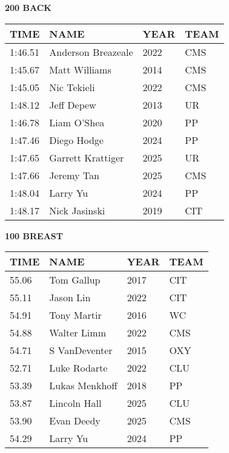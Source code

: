 \begin{minipage}[t]{0.48\textwidth}
\centering
\textbf{200 BACK}\\[0.05cm]
\begin{tabular}{@{}p{1.8cm}p{2.8cm}p{1.2cm}p{1.4cm}@{}}
\hline
\textbf{TIME} & \textbf{NAME} & \textbf{YEAR} & \textbf{TEAM} \\
\hline
1:46.51 & Anderson Breazeale & 2022 & CMS \\
1:45.67 & Matt Williams & 2014 & CMS \\
1:45.05 & Nic Tekieli & 2022 & CMS \\
1:48.12 & Jeff Depew & 2013 & UR \\
1:46.78 & Liam O'Shea & 2020 & PP \\
1:47.46 & Diego Hodge & 2024 & PP \\
1:47.65 & Garrett Krattiger & 2025 & UR \\
1:47.66 & Jeremy Tan & 2025 & CMS \\
1:48.04 & Larry Yu & 2024 & PP \\
1:48.17 & Nick Jasinski & 2019 & CIT \\
\hline
\end{tabular}
\end{minipage}\hfill
\begin{minipage}[t]{0.48\textwidth}
\centering
\textbf{100 BREAST}\\[0.05cm]
\begin{tabular}{@{}p{1.8cm}p{2.8cm}p{1.2cm}p{1.4cm}@{}}
\hline
\textbf{TIME} & \textbf{NAME} & \textbf{YEAR} & \textbf{TEAM} \\
\hline
55.06 & Tom Gallup & 2017 & CIT \\
55.11 & Jason Lin & 2022 & CIT \\
54.91 & Tony Martir & 2016 & WC \\
54.88 & Walter Limm & 2022 & CMS \\
54.71 & S VanDeventer & 2015 & OXY \\
52.71 & Luke Rodarte & 2022 & CLU \\
53.39 & Lukas Menkhoff & 2018 & PP \\
53.87 & Lincoln Hall & 2025 & CLU \\
53.90 & Evan Deedy & 2025 & CMS \\
54.29 & Larry Yu & 2024 & PP \\
\hline
\end{tabular}
\end{minipage}

\vspace{0.4cm}

